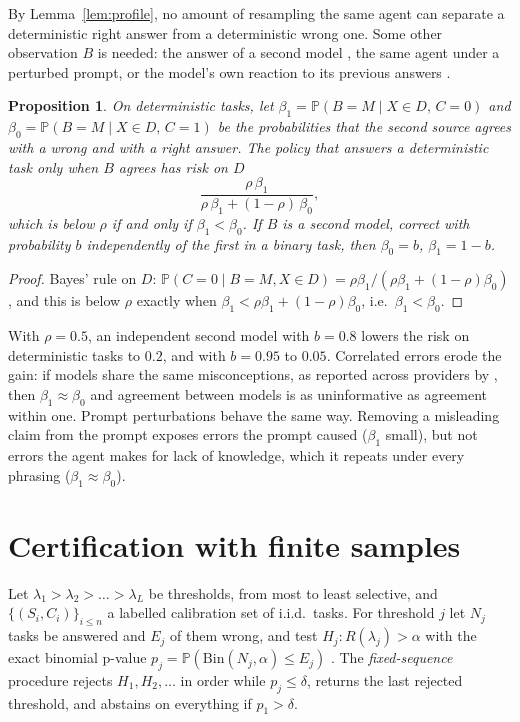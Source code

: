 \documentclass[11pt]{article}
\newtheorem{proposition}{Proposition}
\theoremstyle{definition}
\renewcommand{\P}{\mathbb{P}}
\begin{document}
By Lemma~\ref{lem:profile}, no amount of resampling the same agent can separate a deterministic
right answer from a deterministic wrong one. Some other observation $B$ is needed: the answer of a
second model \citep{hamidieh2026complementing}, the same agent under a perturbed prompt, or the
model's own reaction to its previous answers \citep{yadkori2024believe}.

\begin{proposition}\label{prop:second}
On deterministic tasks, let $\beta_1=\P(B=M\mid X\in D,\,C=0)$ and $\beta_0=\P(B=M\mid X\in D,\,C=1)$
be the probabilities that the second source agrees with a wrong and with a right answer. The
policy that answers a deterministic task only when $B$ agrees has risk on $D$
\[
\frac{\rho\,\beta_1}{\rho\,\beta_1+(1-\rho)\,\beta_0},
\]
which is below $\rho$ if and only if $\beta_1<\beta_0$. If $B$ is a second model, correct with
probability $b$ independently of the first in a binary task, then $\beta_0=b$, $\beta_1=1-b$.
\end{proposition}

\begin{proof}
Bayes' rule on $D$: $\P(C=0\mid B=M,X\in D)=\rho\beta_1/(\rho\beta_1+(1-\rho)\beta_0)$, and this is
below $\rho$ exactly when $\beta_1<\rho\beta_1+(1-\rho)\beta_0$, i.e.\ $\beta_1<\beta_0$.
\end{proof}

With $\rho=0.5$, an independent second model with $b=0.8$ lowers the risk on deterministic tasks to
$0.2$, and with $b=0.95$ to $0.05$. Correlated errors erode the gain: if models share the same
misconceptions, as reported across providers by \citet{ding2026agree}, then $\beta_1\approx\beta_0$
and agreement between models is as uninformative as agreement within one. Prompt perturbations
behave the same way. Removing a misleading claim from the prompt exposes errors the prompt caused
($\beta_1$ small), but not errors the agent makes for lack of knowledge, which it repeats under every
phrasing ($\beta_1\approx\beta_0$).

\section{Certification with finite samples}

Let $\lambda_1>\lambda_2>\dots>\lambda_L$ be thresholds, from most to least selective, and
$\{(S_i,C_i)\}_{i\le n}$ a labelled calibration set of i.i.d.\ tasks. For threshold $j$ let $N_j$
tasks be answered and $E_j$ of them wrong, and test $H_j:R(\lambda_j)>\alpha$ with the exact
binomial p-value $p_j=\P(\mathrm{Bin}(N_j,\alpha)\le E_j)$ \citep{clopper1934}. The
\emph{fixed-sequence} procedure \citep{angelopoulos2021ltt} rejects $H_1,H_2,\dots$ in order while
$p_j\le\delta$, returns the last rejected threshold, and abstains on everything if $p_1>\delta$.
\end{document}

